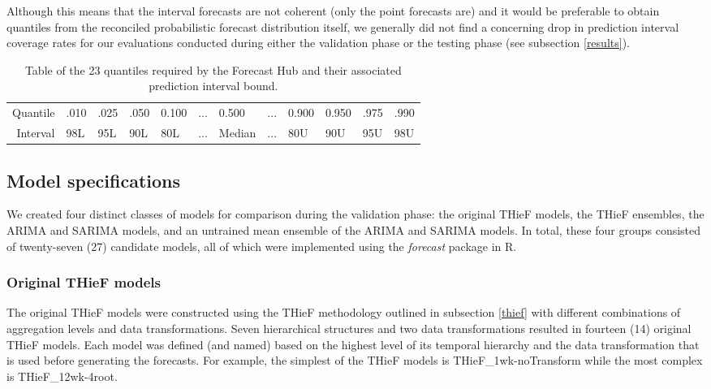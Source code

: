 \documentclass[12pt]{article}
\begin{document}
Although this means that the interval forecasts are not coherent (only the point forecasts are) and it would be preferable to obtain quantiles from the reconciled probabilistic forecast distribution itself, we generally did not find a concerning drop in prediction interval coverage rates for our evaluations conducted during either the validation phase or the testing phase (see subsection \ref{results}).

\begin{table}[h]
\begin{center}
\caption{Table of the 23 quantiles required by the Forecast Hub and their associated prediction interval bound.}
\label{tab:table_quant_int}
\begin{tabular}{rlllllllllll}
  \hline
 &  \\ 
  \hline
Quantile & .010 & .025 & .050 & 0.100 & ... & 0.500 & ... & 0.900 & 0.950 & .975 & .990 \\ 
  Interval & 98L & 95L & 90L & 80L & ... & Median & ... & 80U & 90U & 95U & 98U \\ 
   \hline
\end{tabular}\end{center}
\end{table}

\subsection{Model specifications} \label{model_specifications}
We created four distinct classes of models for comparison during the validation phase: the original THieF models, the THieF ensembles, the ARIMA and SARIMA models, and an untrained mean ensemble of the ARIMA and SARIMA models. In total, these four groups consisted of twenty-seven (27) candidate models, all of which were implemented using the \textit{forecast} package in R.

\subsubsection{Original THieF models} \label{thief_models}
The original THieF models were constructed using the THieF methodology outlined in subsection \ref{thief} with different combinations of aggregation levels and data transformations. Seven hierarchical structures and two data transformations resulted in fourteen (14) original THieF models. Each model was defined (and named) based on the highest level of its temporal hierarchy and the data transformation that is used before generating the forecasts. For example, the simplest of the THieF models is THieF\_1wk-noTransform while the most complex is THieF\_12wk-4root.
\end{document}
